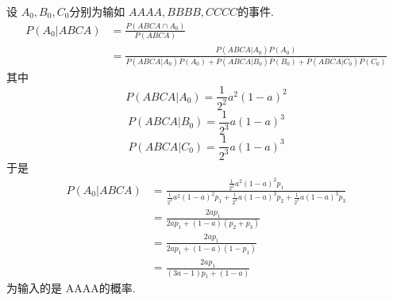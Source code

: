 \documentclass[../main.tex]{subfiles}
\begin{document}
\begin{solution}
设 \(  A_0, B_0,C_0  \)分别为输如 \(  AA A A, B  B B B, C C C C  \)的事件.
 \[
 \begin{aligned}
 P\left( A_0| A B C A\right)&= \frac{P\left( A B C A \cap A_0 \right)  }{P\left( A B C A\right)  }\\ 
  &=    \frac{P\left( AB C A|A_0\right)P\left( A_0 \right)   }{P\left( A B C A |A_0 \right)P\left( A_0 \right)+ P\left( A B C A|B_0 \right)P\left( B_0 \right)+ P \left( A B C A|C_0 \right)P\left( C_0 \right)       } 
 \end{aligned}
 \] 其中 \[
 P\left( A B C A|A_0 \right)= \frac{1 }{2^{2} }a^{2}\left( 1-a \right)^{2}   
 \] \[
 P\left( ABCA|B_0 \right)= \frac{1   }{2^{3}}a\left( 1-a \right)^{3}   
 \] \[
 P\left( ABCA |C_0 \right)= \frac{1 }{2^{3} } a \left( 1-a \right)^{3}   
 \]于是 \[
 \begin{aligned}
 P\left( A_0|ABCA \right)&= \frac{\frac{1 }{2^{2} }a^{2}\left( 1-a \right)^{2}p_1   }{ \frac{1 }{2^{2} }a^{2}\left( 1-a \right)^{2}p_1+ \frac{1 }{2^{3} }a\left( 1-a \right)^{3}p_2+ \frac{1 }{2^{3} }a\left( 1-a \right)^{3}p_3      }  \\ 
  &= \frac{2ap_1  }{2ap_1+ \left( 1-a \right)\left( p_2+ p_3 \right)   }\\ 
   &=  \frac{2ap_1 }{2ap_1+ \left( 1-a \right)\left( 1-p_1 \right)   }\\ 
    &= \frac{2ap_1 }{\left( 3a-1 \right)p_1+ \left( 1-a \right)   }  
 \end{aligned} 
 \]为输入的是 AAAA的概率.
\end{solution}
\end{document}

